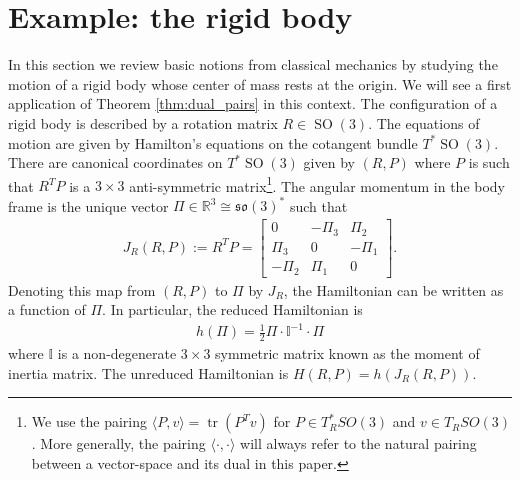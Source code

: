 \documentclass[12pt]{amsart}
\newcommand{\so}{\ensuremath{\mathfrak{so}}}
\DeclareMathOperator{\SO}{SO}
\DeclareMathOperator{\tr}{tr}
\begin{document}
\section{Example: the rigid body}
\label{sec:rigid_body}
  In this section we review basic notions from classical mechanics
by studying the motion of a rigid body whose center of mass rests
at the origin.
We will see a first application of Theorem \ref{thm:dual_pairs}
in this context.
The configuration of a rigid body is described by a
rotation matrix $R \in \SO(3)$.
The equations of motion are given by Hamilton's equations
on the cotangent bundle $T^*\SO(3)$.
There are canonical coordinates on $T^*\SO(3)$ given by $(R,P)$
where $P$ is such that $R^TP $ is a $3 \times 3$ anti-symmetric
matrix\footnote{%
  We use the pairing $\langle P, v \rangle = \tr(P^T v)$ for
  $P \in T^*_R SO(3)$ and $v \in T_R SO(3)$. More generally, the pairing $\langle \cdot , \cdot \rangle$ will always refer to the natural pairing between a vector-space and its dual in this paper.}.
The angular momentum in the body frame is the
unique vector $\Pi \in \mathbb{R}^3 \cong \so(3)^*$ such that
\begin{align*}
  J_R(R,P) := R^TP = \begin{bmatrix}
    0 & -\Pi_3 & \Pi_2 \\
    \Pi_3 & 0 & -\Pi_1 \\
    -\Pi_2 & \Pi_1 & 0 
    \end{bmatrix}.
\end{align*}
Denoting this map from $(R,P)$ to $\Pi$ by $J_R$,
the Hamiltonian can be written as a function
of $\Pi$.  In particular, the reduced Hamiltonian is
\begin{align*}
  h(\Pi) = \frac{1}{2}\Pi \cdot \mathbb{I}^{-1} \cdot \Pi
\end{align*}
where $\mathbb{I}$ is a non-degenerate $3\times 3$ symmetric matrix
known as the moment of inertia matrix.
The unreduced Hamiltonian is $H(R,P) = h(J_R(R,P))$.
\end{document}
